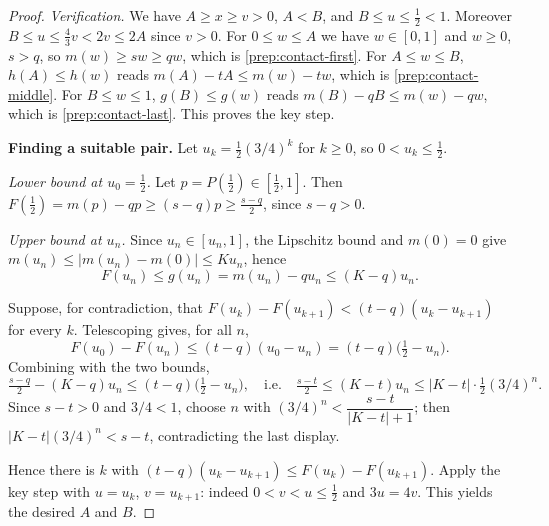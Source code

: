 \begin{proof}
\emph{Verification.} We have $A\ge x\ge v>0$, $A<B$, and $B\le u\le\tfrac12<1$. Moreover $B\le u\le \tfrac43 v<2v\le 2A$ since $v>0$.
For $0\le w\le A$ we have $w\in[0,1]$ and $w\ge0$, $s>q$, so $m(w)\ge sw\ge qw$, which is \eqref{prep:contact-first}.
For $A\le w\le B$, $h(A)\le h(w)$ reads $m(A)-tA\le m(w)-tw$, which is \eqref{prep:contact-middle}.
For $B\le w\le 1$, $g(B)\le g(w)$ reads $m(B)-qB\le m(w)-qw$, which is \eqref{prep:contact-last}.
This proves the key step.

\medskip\noindent\textbf{Finding a suitable pair.} Let $u_k=\tfrac12(3/4)^k$ for $k\ge0$, so $0<u_k\le\tfrac12$.

\emph{Lower bound at $u_0=\tfrac12$.} Let $p=P(\tfrac12)\in[\tfrac12,1]$. Then $F(\tfrac12)=m(p)-qp\ge (s-q)p\ge \tfrac{s-q}{2}$, since $s-q>0$.

\emph{Upper bound at $u_n$.} Since $u_n\in[u_n,1]$, the Lipschitz bound and $m(0)=0$ give $m(u_n)\le |m(u_n)-m(0)|\le Ku_n$, hence
\[
 F(u_n)\le g(u_n)=m(u_n)-qu_n\le (K-q)u_n .
\]

Suppose, for contradiction, that $F(u_k)-F(u_{k+1})<(t-q)(u_k-u_{k+1})$ for every $k$. Telescoping gives, for all $n$,
\[
 F(u_0)-F(u_n)\le (t-q)(u_0-u_n)=(t-q)\bigl(\tfrac12-u_n\bigr).
\]
Combining with the two bounds,
\[
 \tfrac{s-q}{2}-(K-q)u_n\le (t-q)\bigl(\tfrac12-u_n\bigr),
 \quad\text{i.e.}\quad
 \tfrac{s-t}{2}\le (K-t)u_n\le |K-t|\cdot\tfrac12(3/4)^n .
\]
Since $s-t>0$ and $3/4<1$, choose $n$ with $(3/4)^n<\dfrac{s-t}{|K-t|+1}$; then $|K-t|(3/4)^n<s-t$, contradicting the last display.

Hence there is $k$ with $(t-q)(u_k-u_{k+1})\le F(u_k)-F(u_{k+1})$. Apply the key step with $u=u_k$, $v=u_{k+1}$: indeed $0<v<u\le\tfrac12$ and $3u=4v$. This yields the desired $A$ and $B$.
\end{proof}
